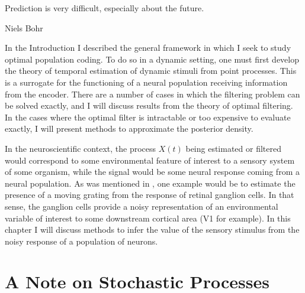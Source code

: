 \epigraph{Prediction is very difficult, especially about the future.}{Niels Bohr}

In the Introduction I described the general framework in which I seek to study optimal population coding. To do so in a dynamic setting, one must first develop the theory
of temporal estimation of dynamic stimuli from point processes. This is a surrogate for the functioning of a neural population receiving information from the encoder.
There are a number of cases in which the filtering problem can be solved exactly, and I will discuss results from the theory of optimal filtering. In the cases where the
optimal filter is intractable or too expensive to evaluate exactly, I will present methods to approximate the posterior density.\par

In the neuroscientific context, the process $X(t)$ being estimated or filtered would correspond to some environmental feature of interest to a sensory system of some organism, while
the signal would be some neural response coming from a neural population. As was mentioned in , one example would be to estimate the presence of a moving
grating from the response of retinal ganglion cells. In that sense, the ganglion cells provide a noisy representation of an environmental variable of interest to some downstream
cortical area (V1 for example). In this chapter I will discuss methods to infer the value of the sensory stimulus from the noisy response of a population of neurons.

\section{A Note on Stochastic Processes}

\label{sec:stochastic_proc}

